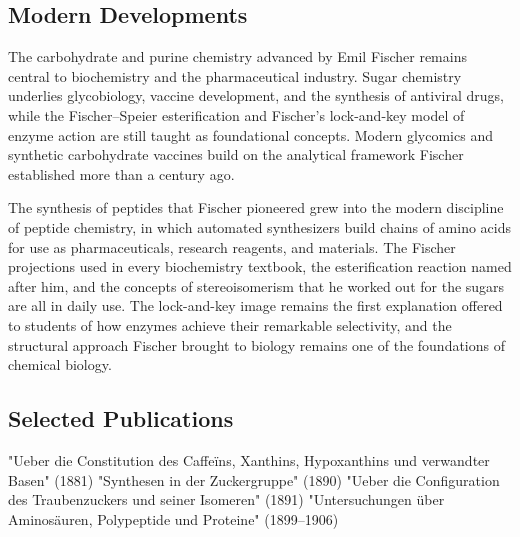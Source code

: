 \subsection*{Modern Developments}

The carbohydrate and purine chemistry advanced by Emil Fischer remains central to biochemistry and the pharmaceutical industry. Sugar chemistry underlies glycobiology, vaccine development, and the synthesis of antiviral drugs, while the Fischer--Speier esterification and Fischer's lock-and-key model of enzyme action are still taught as foundational concepts. Modern glycomics and synthetic carbohydrate vaccines build on the analytical framework Fischer established more than a century ago.

The synthesis of peptides that Fischer pioneered grew into the modern discipline of peptide chemistry, in which automated synthesizers build chains of amino acids for use as pharmaceuticals, research reagents, and materials. The Fischer projections used in every biochemistry textbook, the esterification reaction named after him, and the concepts of stereoisomerism that he worked out for the sugars are all in daily use. The lock-and-key image remains the first explanation offered to students of how enzymes achieve their remarkable selectivity, and the structural approach Fischer brought to biology remains one of the foundations of chemical biology.

\subsection*{Selected Publications}

"Ueber die Constitution des Caffeïns, Xanthins, Hypoxanthins und verwandter Basen" (1881)
"Synthesen in der Zuckergruppe" (1890)
"Ueber die Configuration des Traubenzuckers und seiner Isomeren" (1891)
"Untersuchungen über Aminosäuren, Polypeptide und Proteine" (1899--1906)
